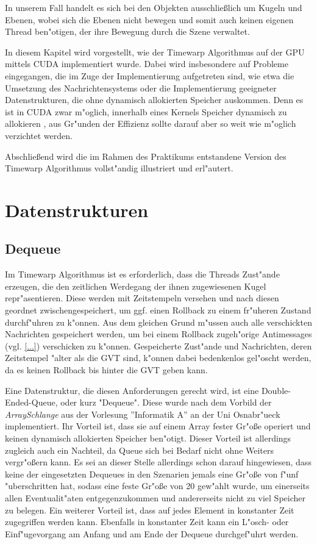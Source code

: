 \documentclass[a4paper, 10pt, openright, parskip, chapterprefix]{scrreprt}
\begin{document}
In unserem Fall handelt es sich bei den Objekten ausschlie\ss lich um Kugeln und Ebenen, wobei sich die Ebenen nicht
bewegen und somit auch keinen eigenen Thread ben"otigen, der ihre Bewegung durch die Szene verwaltet.

In diesem Kapitel wird vorgestellt, wie der Timewarp Algorithmus auf der GPU mittels CUDA implementiert wurde. Dabei wird
insbesondere auf Probleme eingegangen, die im Zuge der Implementierung aufgetreten sind, wie etwa die Umsetzung des
Nachrichtensystems oder die Implementierung geeigneter Datenstrukturen, die ohne dynamisch allokierten Speicher
auskommen. Denn es ist in CUDA zwar m"oglich, innerhalb eines Kernels Speicher dynamisch zu allokieren \cite{...}, aus
Gr"unden der Effizienz sollte darauf aber so weit wie m"oglich verzichtet werden.

Abschlie\ss end wird die im Rahmen des Praktikums entstandene Version des Timewarp Algorithmus vollst"andig illustriert
und erl"autert.

\section{Datenstrukturen}
\subsection{Dequeue}
Im Timewarp Algorithmus ist es erforderlich, dass die Threads Zust"ande erzeugen, die den zeitlichen Werdegang der ihnen zugewiesenen
Kugel repr"asentieren. Diese werden mit Zeitstempeln versehen und nach diesen geordnet zwischengespeichert, um ggf. einen Rollback zu einem
fr"uheren Zustand durchf"uhren zu k"onnen. Aus dem gleichen Grund m"ussen auch alle verschickten Nachrichten gespeichert
werden, um bei einem Rollback zugeh"orige Antimessages (vgl. \ref{...}) verschicken zu k"onnen.
Gespeicherte Zust"ande und Nachrichten, deren Zeitstempel "alter als die GVT sind, k"onnen dabei bedenkenlos gel"oscht
werden, da es keinen Rollback bis hinter die GVT geben kann.

Eine Datenstruktur, die diesen Anforderungen gerecht wird, ist eine Double-Ended-Queue, oder kurz "Dequeue". Diese wurde
nach dem Vorbild der \emph{ArraySchlange} aus der Vorlesung ''Informatik A'' \cite{...} an der Uni Osnabr"ueck
implementiert. Ihr Vorteil ist, dass sie auf einem Array fester Gr"o\ss e operiert und keinen dynamisch allokierten
Speicher ben"otigt. Dieser Vorteil ist allerdings zugleich auch ein Nachteil, da Queue sich bei Bedarf nicht ohne
Weiters vergr"o\ss ern kann. Es sei an dieser Stelle allerdings schon darauf hingewiesen, dass keine der eingesetzten
Dequeues in den Szenarien jemals eine Gr"o\ss e von f"unf "uberschritten hat, sodass eine feste Gr"o\ss e von 20
gew"ahlt wurde, um einerseits allen Eventualit"aten entgegenzukommen und andererseits nicht zu viel Speicher zu belegen.
Ein weiterer Vorteil ist, dass auf jedes Element in konstanter Zeit zugegriffen werden kann. Ebenfalls in konstanter
Zeit kann ein L"osch- oder Einf"ugevorgang am Anfang und am Ende der Dequeue durchgef"uhrt werden.
\end{document}
